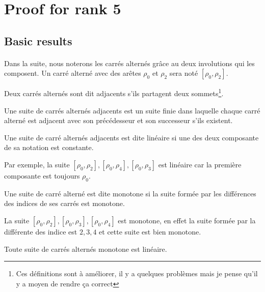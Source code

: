 \section{Proof for rank 5}


\subsection{Basic results}

\paragraph{}
Dans la suite, nous noterons les carrés alternés grâce au deux involutions qui les composent. Un carré alterné avec des arêtes $\rho_0$ et $\rho_2$ sera noté $[\rho_0, \rho_2]$.

\begin{definition}
  Deux carrés alternés sont dit adjacents s'ils partagent deux sommets\footnote{Ces définitions sont à améliorer, il y a quelques problèmes mais je pense qu'il y a moyen de rendre ça correct}.
\end{definition}

\begin{definition}
  Une suite de carrés alternés adjacents est un suite finie dans laquelle chaque carré alterné est adjacent avec son précédesseur et son successeur s'ils existent.
\end{definition}

\begin{definition}
  Une suite de carré alternés adjacents est dite linéaire si une des deux composante de sa notation est constante.
\end{definition}

Par exemple, la suite $[\rho_0, \rho_2], [\rho_0, \rho_4], [\rho_0, \rho_3]$ est linéaire car la première composante est toujours $\rho_0$.

\begin{definition}
  Une suite de carré alterné est dite monotone si la suite formée par les différences des indices de ses carrés est monotone.
\end{definition}

La suite $[\rho_0, \rho_2], [\rho_0, \rho_3], [\rho_0, \rho_4]$ est monotone, en effet la suite formée par la différente des indice est $2, 3, 4$ et cette suite est bien monotone.

\begin{proposition}
  Toute suite de carrés alternés monotone est linéaire.
\end{proposition}

